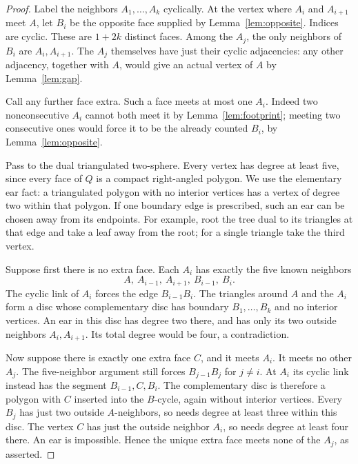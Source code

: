 \documentclass[11pt]{article}
\theoremstyle{remark}
\begin{document}
\begin{proof}
Label the neighbors $A_1,\ldots,A_k$ cyclically. At the vertex where
$A_i$ and $A_{i+1}$ meet $A$, let $B_i$ be the opposite face supplied by
Lemma~\ref{lem:opposite}. Indices are cyclic. These are $1+2k$ distinct
faces. Among the $A_j$, the only neighbors of $B_i$ are $A_i,A_{i+1}$.
The $A_j$ themselves have just their cyclic adjacencies: any other
adjacency, together with $A$, would give an actual vertex of $A$ by
Lemma~\ref{lem:gap}.

Call any further face extra. Such a face meets at most one $A_i$.
Indeed two nonconsecutive $A_i$ cannot both meet it by
Lemma~\ref{lem:footprint}; meeting two consecutive ones would force it
to be the already counted $B_i$, by Lemma~\ref{lem:opposite}.

Pass to the dual triangulated two-sphere. Every vertex has degree at
least five, since every face of $Q$ is a compact right-angled polygon.
We use the elementary ear fact: a triangulated polygon with no interior
vertices has a vertex of degree two within that polygon. If one boundary
edge is prescribed, such an ear can be chosen away from its endpoints.
For example, root the tree dual to its triangles at that edge and take
a leaf away from the root; for a single triangle take the third vertex.

Suppose first there is no extra face. Each $A_i$ has exactly the five
known neighbors
\[
 A,\ A_{i-1},\ A_{i+1},\ B_{i-1},\ B_i.
\]
The cyclic link of $A_i$ forces the edge $B_{i-1}B_i$. The triangles
around $A$ and the $A_i$ form a disc whose complementary disc has boundary
$B_1,\ldots,B_k$ and no interior vertices. An ear in this disc has
degree two there, and has only its two outside neighbors $A_i,A_{i+1}$.
Its total degree would be four, a contradiction.

Now suppose there is exactly one extra face $C$, and it meets $A_i$.
It meets no other $A_j$. The five-neighbor argument still forces
$B_{j-1}B_j$ for $j\ne i$. At $A_i$ its cyclic link instead has the
segment $B_{i-1},C,B_i$. The complementary disc is therefore a polygon
with $C$ inserted into the $B$-cycle, again without interior vertices.
Every $B_j$ has just two outside $A$-neighbors, so needs degree at least
three within this disc. The vertex $C$ has just the outside neighbor
$A_i$, so needs degree at least four there. An ear is impossible. Hence
the unique extra face meets none of the $A_j$, as asserted.
\end{proof}
\end{document}

